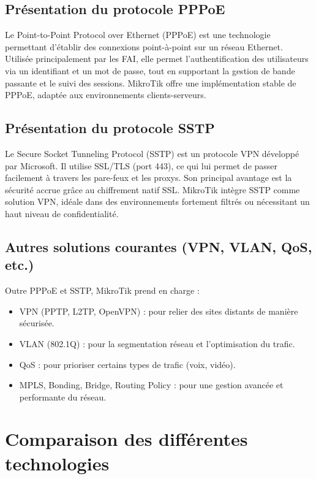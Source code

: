 \subsection{Présentation du protocole \gls{PPPoE}}
Le Point-to-Point Protocol over Ethernet (\gls{PPPoE}) est une technologie permettant 
d'établir des connexions point-à-point sur un réseau Ethernet. Utilisée principalement 
par les FAI, elle permet l’authentification des utilisateurs via un identifiant et un mot 
de passe, tout en supportant la gestion de bande passante et le suivi des sessions. 
MikroTik offre une implémentation stable de PPPoE, adaptée aux environnements 
clients-serveurs\cite{mikrotik-pppoe}.

\subsection{Présentation du protocole SSTP}
Le Secure Socket Tunneling Protocol (\gls{SSTP}) est un protocole VPN développé par 
Microsoft. Il utilise \gls{SSL}/\gls{TLS} (port 443), ce qui lui permet de passer facilement à 
travers les pare-feux et les proxys. Son principal avantage est la sécurité accrue grâce 
au chiffrement natif SSL. MikroTik intègre SSTP comme solution VPN, idéale dans 
des environnements fortement filtrés ou nécessitant un haut niveau de confidentialité\cite{mikrotik-sstp}.

\subsection{Autres solutions courantes (\gls{VPN}, \gls{VLAN}, \gls{QoS}, etc.)}
Outre \gls{PPPoE} et \gls{SSTP}, MikroTik prend en charge : 
\begin{itemize}
    \item VPN (\gls{PPTP}, \gls{L2TP}, \gls{OpenVPN}) : pour relier des sites distants de manière 
    sécurisée.
    \item \gls{VLAN} (802.1Q) : pour la segmentation réseau et l’optimisation du trafic.
    \item \gls{QoS} : pour prioriser certains types de trafic (voix, vidéo).
    \item \gls{MPLS}, Bonding, Bridge, Routing Policy : pour une gestion avancée et 
    performante du réseau.
\end{itemize}

\section{Comparaison des différentes technologies}

